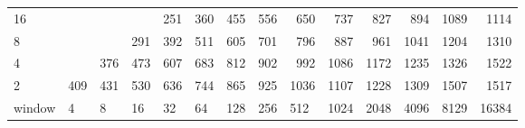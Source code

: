 \begin{table}[h]
{\begin{tabular}{lrrrrrrrrrrrrr}
			\multicolumn{1}{|l|}{16} &  &  &  & \cellcolor[HTML]{99E600}251 & \cellcolor[HTML]{99E600}360 & \cellcolor[HTML]{E69900}455 & \cellcolor[HTML]{E69900}556 & \cellcolor[HTML]{E69900}650 & \cellcolor[HTML]{E60000}737 & \cellcolor[HTML]{E60000}827 & \cellcolor[HTML]{E60000}894 & \cellcolor[HTML]{9900E6}1089 & \cellcolor[HTML]{9900E6}1114 \\ \cline{1-1}
			\multicolumn{1}{|l|}{8} &  &  & \cellcolor[HTML]{99E600}291 & \cellcolor[HTML]{99E600}392 & \cellcolor[HTML]{E69900}511 & \cellcolor[HTML]{E69900}605 & \cellcolor[HTML]{E69900}701 & \cellcolor[HTML]{E60000}796 & \cellcolor[HTML]{E60000}887 & \cellcolor[HTML]{E60000}961 & \cellcolor[HTML]{9900E6}1041 & \cellcolor[HTML]{9900E6}1204 & \cellcolor[HTML]{4C00E6}1310 \\ \cline{1-1}
			\multicolumn{1}{|l|}{4} &  & \cellcolor[HTML]{99E600}376 & \cellcolor[HTML]{99E600}473 & \cellcolor[HTML]{E69900}607 & \cellcolor[HTML]{E69900}683 & \cellcolor[HTML]{E60000}812 & \cellcolor[HTML]{E60000}902 & \cellcolor[HTML]{9900E6}992 & \cellcolor[HTML]{9900E6}1086 & \cellcolor[HTML]{9900E6}1172 & \cellcolor[HTML]{9900E6}1235 & \cellcolor[HTML]{4C00E6}1326 & \cellcolor[HTML]{4C00E6}1522 \\ \cline{1-1}
			\multicolumn{1}{|l|}{2} & \cellcolor[HTML]{99E600}409 & \cellcolor[HTML]{99E600}431 & \cellcolor[HTML]{E69900}530 & \cellcolor[HTML]{E69900}636 & \cellcolor[HTML]{E60000}744 & \cellcolor[HTML]{E60000}865 & \cellcolor[HTML]{E60000}925 & \cellcolor[HTML]{9900E6}1036 & \cellcolor[HTML]{9900E6}1107 & \cellcolor[HTML]{9900E6}1228 & \cellcolor[HTML]{4C00E6}1309 & \cellcolor[HTML]{4C00E6}1507 & \cellcolor[HTML]{4C00E6}1517 \\ \cline{1-1}
			\multicolumn{1}{l|}{window} & \multicolumn{1}{l|}{4} & \multicolumn{1}{l|}{8} & \multicolumn{1}{l|}{16} & \multicolumn{1}{l|}{32} & \multicolumn{1}{l|}{64} & \multicolumn{1}{l|}{128} & \multicolumn{1}{l|}{256} & \multicolumn{1}{l|}{512} & \multicolumn{1}{l|}{1024} & \multicolumn{1}{l|}{2048} & \multicolumn{1}{l|}{4096} & \multicolumn{1}{l|}{8129} & \multicolumn{1}{l|}{16384} \\ \cline{2-14}
		\end{tabular}
	}
\end{table}

